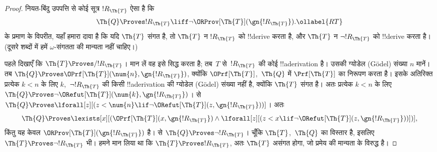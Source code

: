 \documentclass[../../../include/open-logic-section]{subfiles}
\begin{document}
\begin{proof}
नियत-बिंदु उपपत्ति से कोई सूत्र $!R_\Th{T}$ ऐसा है कि
\begin{equation}
  \Th{Q} \Proves !R_\Th{T} \liff \lnot \ORProv[\Th{T}](\gn{!R_\Th{T}}).
  \ollabel{RT}
\end{equation}
 के प्रमाण के विपरीत, यहाँ हमारा दावा
है कि यदि $\Th{T}$ संगत है, तो $\Th{T}$ न $!R_\Th{T}$ को !!{derive} करता है,
और $\Th{T}$ न $\lnot !R_\Th{T}$ को !!{derive} करता है। (दूसरे शब्दों में हमें
$\omega$-संगतता की मान्यता नहीं चाहिए।)

पहले दिखाएँ कि $\Th{T} \Proves/ !R_{\Th{T}}$। मान लें वह इसे सिद्ध करता
है; तब~$T$ से~$!R_{\Th{T}}$ की कोई !!a{derivation} है। उसकी ग्योडेल (G\"odel) संख्या
$n$ मानें। तब
$\Th{Q} \Proves \OPrf[\Th{T}](\num{n}, \gn{!R_{\Th{T}}})$, क्योंकि
$\OPrf[\Th{T}]$,~$\Th{Q}$ में $\Prf[\Th{T}]$ का निरूपण करता है। इसके
अतिरिक्त प्रत्येक $k < n$ के लिए $k$,~$\lnot !R_{\Th{T}}$ की किसी
!!a{derivation} की ग्योडेल (G\"odel) संख्या नहीं है, क्योंकि $\Th{T}$ संगत है। अतः
प्रत्येक $k < n$ के लिए
$\Th{Q} \Proves \lnot \ORefut[\Th{T}](\num{k}, \gn{!R_{\Th{T}}})$।
 से
$\Th{Q} \Proves \lforall[z][(z < \num{n} \lif \lnot \ORefut[\Th{T}](z,
  \gn{!R_{\Th{T}}}))]$। अतः
\[
\Th{Q} \Proves \lexists[x][(\OPrf[\Th{T}](x,\gn{!R_{\Th{T}}}) \land \lforall[z][(z
    < x \lif \lnot \ORefut[\Th{T}](z,\gn{!R_{\Th{T}}}))])],
\]
किंतु यह केवल $\ORProv[\Th{T}](\gn{!R_{\Th{T}}})$ है।  से
$\Th{Q} \Proves \lnot !R_{\Th{T}}$। चूँकि $\Th{T}$,~$\Th{Q}$ का विस्तार
है, इसलिए $\Th{T} \Proves \lnot !R_{\Th{T}}$ भी। हमने मान लिया था कि
$\Th{T} \Proves !R_{\Th{T}}$, अतः $\Th{T}$ असंगत होगा, जो प्रमेय की
मान्यता के विरुद्ध है।


\end{proof}
\end{document}
